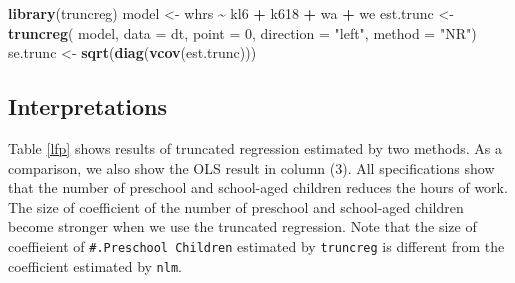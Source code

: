 \documentclass[
  12pt,
]{article}
\newenvironment{Shaded}{\begin{snugshade}}{\end{snugshade}}
\newcommand{\DataTypeTok}[1]{\textcolor[rgb]{0.13,0.29,0.53}{#1}}
\newcommand{\DecValTok}[1]{\textcolor[rgb]{0.00,0.00,0.81}{#1}}
\newcommand{\KeywordTok}[1]{\textcolor[rgb]{0.13,0.29,0.53}{\textbf{#1}}}
\newcommand{\NormalTok}[1]{#1}
\newcommand{\OperatorTok}[1]{\textcolor[rgb]{0.81,0.36,0.00}{\textbf{#1}}}
\newcommand{\StringTok}[1]{\textcolor[rgb]{0.31,0.60,0.02}{#1}}
\begin{document}
\begin{Shaded}
\begin{Highlighting}[]
\KeywordTok{library}\NormalTok{(truncreg)}
\NormalTok{model \textless{}{-}}\StringTok{ }\NormalTok{whrs }\OperatorTok{\textasciitilde{}}\StringTok{ }\NormalTok{kl6 }\OperatorTok{+}\StringTok{ }\NormalTok{k618 }\OperatorTok{+}\StringTok{ }\NormalTok{wa }\OperatorTok{+}\StringTok{ }\NormalTok{we}
\NormalTok{est.trunc \textless{}{-}}\StringTok{ }\KeywordTok{truncreg}\NormalTok{(}
\NormalTok{  model, }\DataTypeTok{data =}\NormalTok{ dt, }\DataTypeTok{point =} \DecValTok{0}\NormalTok{, }\DataTypeTok{direction =} \StringTok{"left"}\NormalTok{, }\DataTypeTok{method =} \StringTok{"NR"}\NormalTok{)}
\NormalTok{se.trunc \textless{}{-}}\StringTok{ }\KeywordTok{sqrt}\NormalTok{(}\KeywordTok{diag}\NormalTok{(}\KeywordTok{vcov}\NormalTok{(est.trunc)))}
\end{Highlighting}
\end{Shaded}

\hypertarget{interpretations}{%
\subsection{Interpretations}\label{interpretations}}

Table \ref{lfp} shows results of truncated regression estimated by two
methods. As a comparison, we also show the OLS result in column (3). All
specifications show that the number of preschool and school-aged
children reduces the hours of work. The size of coefficient of the
number of preschool and school-aged children become stronger when we use
the truncated regression. Note that the size of coeffieient of
\texttt{\#.Preschool\ Children} estimated by \texttt{truncreg} is
different from the coefficient estimated by \texttt{nlm}.
\end{document}
